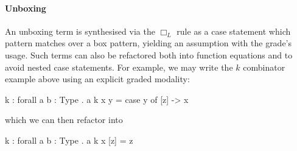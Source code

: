 \paragraph{Unboxing}
An unboxing term is synthesised via the $\Box_{L}$ rule as a case statement which pattern matches over a box pattern, yielding an assumption with the grade's usage. Such terms can also be refactored both into function equations and to avoid nested case statements. For example, we may write the $k$ combinator example above using an explicit graded modality:
\begin{granule}
k : forall {a b : Type} . a %
k x y = case y of [z] -> x
\end{granule}
which we can then refactor into
\begin{granule}
k : forall {a b : Type} . a %
k x [z] = z
\end{granule}







